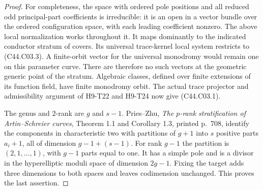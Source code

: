 \begin{proof}
For completeness, the space with ordered pole positions and all
reduced odd principal-part coefficients is irreducible: it is an open
in a vector bundle over the ordered configuration space, with each
leading coefficient nonzero. The above local normalization works
throughout it. It maps dominantly to the indicated conductor stratum
of covers. Its universal trace-kernel local system restricts to
(C44.C03.3). A finite-orbit vector for the universal monodromy would
remain one on this parameter curve. There are therefore no such
vectors at the geometric generic point of the stratum. Algebraic
classes, defined over finite extensions of its function field, have
finite monodromy orbit. The actual trace projector and admissibility
argument of H9-T22 and H9-T24 now give (C44.C03.1).

The genus and $2$-rank are $g$ and $s-1$. Pries--Zhu,
\emph{The $p$-rank stratification of Artin--Schreier curves},
Theorem 1.1 and Corollary 1.3, printed p.~708, identify the components
in characteristic two with partitions of $g+1$ into $s$ positive
parts $a_i+1$, all of dimension $g-1+(s-1)$. For rank $g-1$ the
partition is $(2,1,\ldots,1)$, with $g-1$ parts equal to one.
It has a simple pole and is a divisor in the hyperelliptic moduli
space of dimension $2g-1$. Fixing the target adds three dimensions
to both spaces and leaves codimension unchanged. This proves the
last assertion.
\end{proof}

